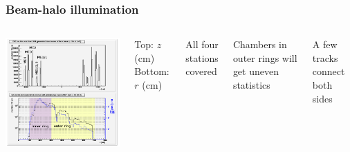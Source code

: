 \documentclass[compress]{beamer}
\begin{document}
\begin{frame}
\frametitle{Beam-halo illumination}
\begin{columns}
\vspace{0.25 cm}
\includegraphics[width=\linewidth]{karoly_illumination2.png}
\vspace{-0.25 cm}
\begin{center}
Top: $z$ (cm) \hspace{0.5 cm} Bottom: $r$ (cm)
\end{center}

All four stations covered

\vspace{0.2 cm}
Chambers in outer rings will get uneven statistics

\vspace{0.2 cm}
A few tracks connect both sides


\end{columns}
\end{frame}
\end{document}
